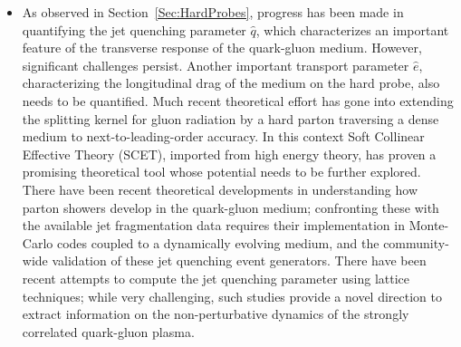 \begin{itemize}

\item
As observed in Section~\ref{Sec:HardProbes}, progress has been made in quantifying the jet quenching parameter $\hat{q}$, which characterizes an important feature of the transverse response of the quark-gluon medium. However, significant challenges persist.  Another important transport parameter $\hat{e}$, characterizing the longitudinal drag of the medium on the hard probe, also needs to be quantified. Much recent theoretical effort has gone into extending the splitting kernel for gluon radiation by a hard parton traversing a dense medium to next-to-leading-order accuracy. In this context Soft Collinear Effective Theory (SCET), imported from high energy theory, has proven a promising theoretical tool whose potential needs to be further explored. There have been recent theoretical developments in understanding how parton showers develop in the quark-gluon medium; confronting these with the available jet fragmentation data requires their implementation in Monte-Carlo codes coupled to a dynamically evolving medium, 
and
the community-wide validation of  these jet quenching 
event generators.
There have been recent attempts to compute the jet quenching parameter using lattice techniques; while very challenging, such studies provide a novel direction to extract information on the non-perturbative dynamics of the strongly correlated quark-gluon plasma.


\end{itemize}
